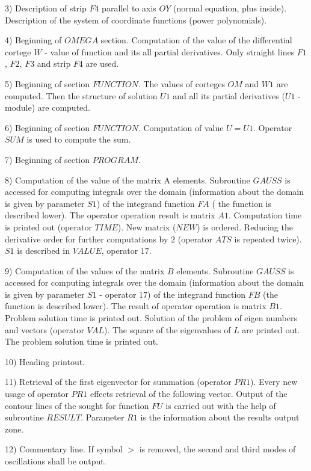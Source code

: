 3) Description of strip $F4$ parallel to axis $OY$ (normal equation, plus
inside). Description of the system of coordinate functions (power
polynomials).

4) Beginning of $OMEGA$ section. Computation of the value of the
differential cortege $W$ - value of function and its all partial
derivatives. Only straight lines $F1$, $F2$, $F3$ and strip $F4$ are used.

5) Beginning of section $FUNCTION$. The values of corteges $OM$ and $W1$ are
computed. Then the structure of solution $U1$ and all its partial
derivatives ($U1$ - module) are computed.

6) Beginning of section $FUNCTION$. Computation of value $U=U1$. Operator $%
SUM$ is used to compute the sum.

7) Beginning of section $PROGRAM$.

8) Computation of the value of the matrix A elements. Subroutine $GAUSS$ is
accessed for computing integrals over the domain (information about the
domain is given by parameter $S1$) of the integrand function $FA$ ( the
function is described lower). The operator operation result is matrix $A1$.
Computation time is printed out (operator $TIME$). New matrix ($NEW$) is
ordered. Reducing the derivative order for further computations by $2$
(operator $ATS$ is repeated twice). $S1$ is described in $VALUE$, operator $%
17$.

9) Computation of the values of the matrix $B$ elements. Subroutine $GAUSS$
is accessed for computing integrals over the domain (information about the
domain is given by parameter $S1$ - operator $17$) of the integrand function 
$FB$ (the function is described lower). The result of operator operation is
matrix $B1$. Problem solution time is printed out. Solution of the problem
of eigen numbers and vectors (operator $VAL$). The square of the eigenvalues
of $L$ are printed out. The problem solution time is printed out.

10) Heading printout.

11) Retrieval of the first eigenvector for summation (operator $PR1$). Every
new usage of operator $PR1$ effects retrieval of the following vector.
Output of the contour lines of the sought for function $FU$ is carried out
with the help of subroutine $RESULT$. Parameter $R1$ is the information
about the results output zone.

12) Commentary line. If symbol $>$ is removed, the second and third modes of
oscillations shall be output.

